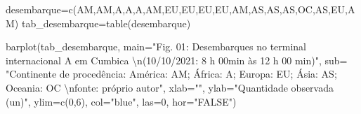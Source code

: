 \documentclass[
]{book}
\newenvironment{Shaded}{\begin{snugshade}}{\end{snugshade}}
\newcommand{\AttributeTok}[1]{\textcolor[rgb]{0.77,0.63,0.00}{#1}}
\newcommand{\DecValTok}[1]{\textcolor[rgb]{0.00,0.00,0.81}{#1}}
\newcommand{\FunctionTok}[1]{\textcolor[rgb]{0.00,0.00,0.00}{#1}}
\newcommand{\NormalTok}[1]{#1}
\newcommand{\OtherTok}[1]{\textcolor[rgb]{0.56,0.35,0.01}{#1}}
\newcommand{\SpecialCharTok}[1]{\textcolor[rgb]{0.00,0.00,0.00}{#1}}
\newcommand{\StringTok}[1]{\textcolor[rgb]{0.31,0.60,0.02}{#1}}
\begin{document}
\hfill\break

\begin{Shaded}
\begin{Highlighting}[]
\NormalTok{desembarque}\OtherTok{=}\FunctionTok{c}\NormalTok{(}\StringTok{\textquotesingle{}AM\textquotesingle{}}\NormalTok{,}\StringTok{\textquotesingle{}AM\textquotesingle{}}\NormalTok{,}\StringTok{\textquotesingle{}A\textquotesingle{}}\NormalTok{,}\StringTok{\textquotesingle{}A\textquotesingle{}}\NormalTok{,}\StringTok{\textquotesingle{}A\textquotesingle{}}\NormalTok{,}\StringTok{\textquotesingle{}AM\textquotesingle{}}\NormalTok{,}\StringTok{\textquotesingle{}EU\textquotesingle{}}\NormalTok{,}\StringTok{\textquotesingle{}EU\textquotesingle{}}\NormalTok{,}\StringTok{\textquotesingle{}EU\textquotesingle{}}\NormalTok{,}\StringTok{\textquotesingle{}EU\textquotesingle{}}\NormalTok{,}\StringTok{\textquotesingle{}AM\textquotesingle{}}\NormalTok{,}\StringTok{\textquotesingle{}AS\textquotesingle{}}\NormalTok{,}\StringTok{\textquotesingle{}AS\textquotesingle{}}\NormalTok{,}\StringTok{\textquotesingle{}AS\textquotesingle{}}\NormalTok{,}\StringTok{\textquotesingle{}OC\textquotesingle{}}\NormalTok{,}\StringTok{\textquotesingle{}AS\textquotesingle{}}\NormalTok{,}\StringTok{\textquotesingle{}EU\textquotesingle{}}\NormalTok{,}\StringTok{\textquotesingle{}AM\textquotesingle{}}\NormalTok{)}
\NormalTok{tab\_desembarque}\OtherTok{=}\FunctionTok{table}\NormalTok{(desembarque)}

\FunctionTok{barplot}\NormalTok{(tab\_desembarque,}
        \AttributeTok{main=}\StringTok{"Fig. 01: Desembarques no terminal internacional A em Cumbica }\SpecialCharTok{\textbackslash{}n}\StringTok{(10/10/2021: 8 h 00min às 12 h 00 min)"}\NormalTok{,}
        \AttributeTok{sub=} \StringTok{"Continente de procedência: América: AM; África: A; Europa: EU; Ásia: AS; Oceania: OC }\SpecialCharTok{\textbackslash{}n}\StringTok{fonte: próprio autor"}\NormalTok{,}
        \AttributeTok{xlab=}\StringTok{""}\NormalTok{,}
        \AttributeTok{ylab=}\StringTok{"Quantidade observada (un)"}\NormalTok{,}
        \AttributeTok{ylim=}\FunctionTok{c}\NormalTok{(}\DecValTok{0}\NormalTok{,}\DecValTok{6}\NormalTok{),}
        \AttributeTok{col=}\StringTok{"blue"}\NormalTok{,}
        \AttributeTok{las=}\DecValTok{0}\NormalTok{, }
        \AttributeTok{hor=}\StringTok{"FALSE"}\NormalTok{)}
\end{Highlighting}
\end{Shaded}
\end{document}
